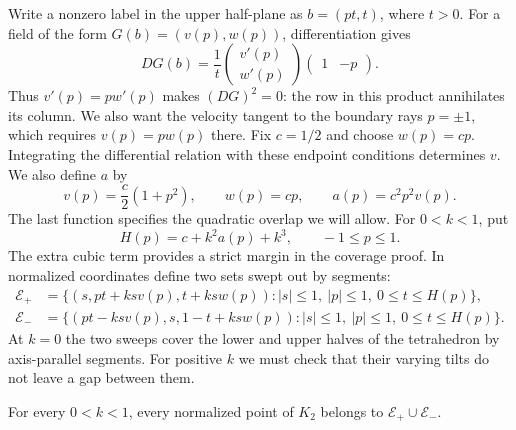 Write a nonzero label in the upper half-plane as $b=(pt,t)$,
where $t>0$.  For a field of the form $G(b)=(v(p),w(p))$,
differentiation gives
\[
 DG(b)=\frac1t
 \begin{pmatrix}v'(p)\\w'(p)\end{pmatrix}
 \begin{pmatrix}1&-p\end{pmatrix}.
\]
Thus $v'(p)=p w'(p)$ makes $(DG)^2=0$: the row in this product
annihilates its column.  We also want the velocity tangent to the
boundary rays $p=\pm1$, which requires $v(p)=p w(p)$ there.
Fix $c=1/2$ and choose $w(p)=cp$. Integrating the differential relation
with these endpoint conditions determines $v$. We also define $a$ by
\begin{equation}\label{c:nil-angular-functions}
 v(p)=\frac c2(1+p^2),\qquad w(p)=cp,
 \qquad a(p)=c^2p^2v(p).
\end{equation}
The last function specifies the quadratic overlap we will allow.
For $0<k<1$, put
\[
 H(p)=c+k^2a(p)+k^3,\qquad -1\le p\le1.
\]
The extra cubic term provides a strict margin in the coverage proof.
In normalized coordinates define two sets swept out by segments:
\begin{equation}\label{c:nil-sweeps}
 \begin{aligned}
 \mathcal E_+&=\{(s,pt+ksv(p),t+ksw(p)):
     |s|\le1,\ |p|\le1,\ 0\le t\le H(p)\},\\
 \mathcal E_-&=\{(pt-ksv(p),s,1-t+ksw(p)):
     |s|\le1,\ |p|\le1,\ 0\le t\le H(p)\}.
 \end{aligned}
\end{equation}
At $k=0$ the two sweeps cover the lower and upper halves of the
tetrahedron by axis-parallel segments.  For positive $k$ we must check that
their varying tilts do not leave a gap between them.

\begin{lemma}\label{c:nil-sweep-cover}
For every $0<k<1$, every normalized point of
$K_2$ belongs to $\mathcal E_+\cup\mathcal E_-$.
\end{lemma}

